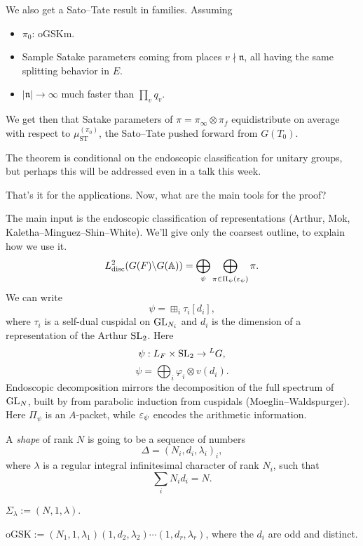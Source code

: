 \documentclass[reqno]{amsart} 
\begin{document}
We also get a Sato--Tate result in families.  Assuming
\begin{itemize}
\item $\pi_0$: oGSKm.
\item Sample Satake parameters coming from places $v \nmid \mathfrak{n}$, all having the same splitting behavior in $E$.
\item $\lvert \mathfrak{n}  \rvert \rightarrow \infty $ much faster than $\prod_v q_v$.
\end{itemize}
We get then that Satake parameters of $\pi = \pi _\infty \otimes \pi_f $ equidistribute on average with respect to $\mu_{\mathrm{ST}}^{ (\pi_0 )}$, the Sato--Tate pushed forward from $G (T_0)$.

The theorem is conditional on the endoscopic classification for unitary groups, but perhaps this will be addressed even in a talk this week.

That's it for the applications.  Now, what are the main tools for the proof?

The main input is the endoscopic classification of representations (Arthur, Mok, Kaletha--Minguez--Shin--White).  We'll give only the coarsest outline, to explain how we use it.
\begin{equation*}
  L^2_{\operatorname{disc}} (G (F) \backslash G (\mathbb{A} ))
  = \bigoplus_\psi \bigoplus_{\pi \in \Pi_\psi (\varepsilon_\psi )} \pi.
\end{equation*}
We can write
\begin{equation*}
\psi = \boxplus_i \tau_i [d_i ],
\end{equation*}
where $\tau_i $ is a self-dual cuspidal on $\operatorname{GL}_{N_i }$ and $d_i$ is the dimension of a representation of the Arthur $\operatorname{SL}_2$.  Here
\begin{equation*}
\psi : L_F  \times \operatorname{SL}_2 \rightarrow {}^L G,
\end{equation*}
\begin{equation*}
\psi = \bigoplus_i \varphi_i \otimes v (d_i ).
\end{equation*}
Endoscopic decomposition mirrors the decomposition of the full spectrum of $\operatorname{GL}_N $, built by from parabolic induction from cuspidals (Moeglin--Waldspurger).  Here $\Pi_\psi $ is an $A$-packet, while $\varepsilon_\psi $ encodes the arithmetic information.

\begin{definition}
  A \emph{shape} of rank $N$ is going to be a sequence of numbers
  \begin{equation*}
    \Delta = (N_i, d_i, \lambda_i )_i ,
  \end{equation*}
  where $\lambda $ is a regular integral infinitesimal character of rank $N_i$, such that
  \begin{equation*}
    \sum_i N_i d_i = N.
  \end{equation*}
\end{definition}
\begin{example}
$\Sigma_\lambda := (N, 1, \lambda)$.
\end{example}
\begin{example}
$\mathrm{oGSK} := (N_1, 1, \lambda_1 ) (1 , d_2, \lambda_2 ) \dotsb (1, d_r, \lambda_r )$, where the $d_i $ are odd and distinct.
\end{example}
\end{document}
